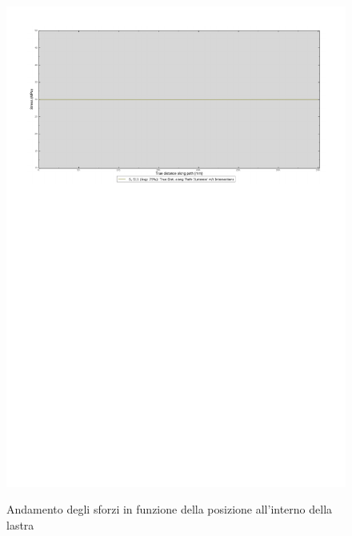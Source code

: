 \begin{figure}
{\includegraphics[width=\textwidth,trim=0 0.6cm 0 3cm,clip]{rel2/img2/GraficoPathCostante.pdf}}
\caption{Andamento degli sforzi in funzione della posizione all'interno della lastra} 
\label{fig:Grafici}
\end{figure}
\clearpage
{}
\label{GraficoConfronto}

